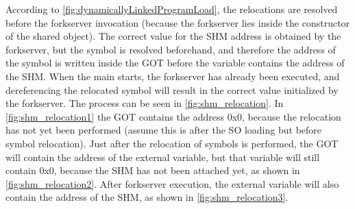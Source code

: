 According to \cref{fig:dynamicallyLinkedProgramLoad}, the relocations are resolved before the forkserver invocation (because the 
forkserver lies inside the constructor of the shared object).
The correct value for the \gls{SHM} address is obtained by the forkserver, but the symbol is resolved beforehand, and therefore 
the address of the symbol is written inside the \gls{GOT} before the variable contains the address of the \gls{SHM}.
When the main starts, the forkserver has already been executed, and dereferencing the relocated symbol will result 
in the correct value initialized by the forkserver.
The process can be seen in \cref{fig:shm_relocation}.
In \cref{fig:shm_relocation1} the \gls{GOT} contains the address 0x0, because the relocation has not yet been performed 
(assume this is after the \gls{SO} loading but before symbol relocation).
Just after the relocation of symbols is performed, the \gls{GOT} will contain the address of the external variable, 
but that variable will still contain 0x0, because the \gls{SHM} has not been attached yet, as shown in \cref{fig:shm_relocation2}.
After forkserver execution, the external variable will also contain the address of the \gls{SHM}, as shown in \cref{fig:shm_relocation3}.